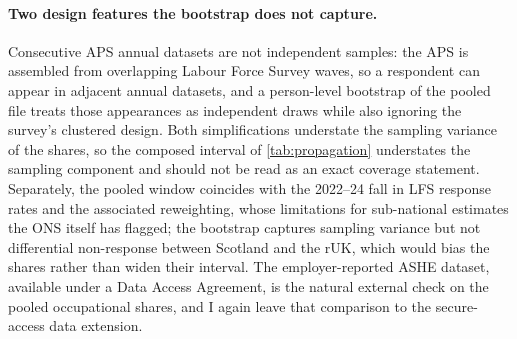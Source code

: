 \paragraph{Two design features the bootstrap does not capture.} Consecutive APS annual datasets are not independent samples: the APS is assembled from overlapping Labour Force Survey waves, so a respondent can appear in adjacent annual datasets, and a person-level bootstrap of the pooled file treats those appearances as independent draws while also ignoring the survey's clustered design. Both simplifications understate the sampling variance of the shares, so the composed interval of \cref{tab:propagation} understates the sampling component and should not be read as an exact coverage statement. Separately, the pooled window coincides with the 2022--24 fall in LFS response rates and the associated reweighting, whose limitations for sub-national estimates the ONS itself has flagged; the bootstrap captures sampling variance but not differential non-response between Scotland and the rUK, which would bias the shares rather than widen their interval. The employer-reported ASHE dataset, available under a Data Access Agreement, is the natural external check on the pooled occupational shares, and I again leave that comparison to the secure-access data extension.

